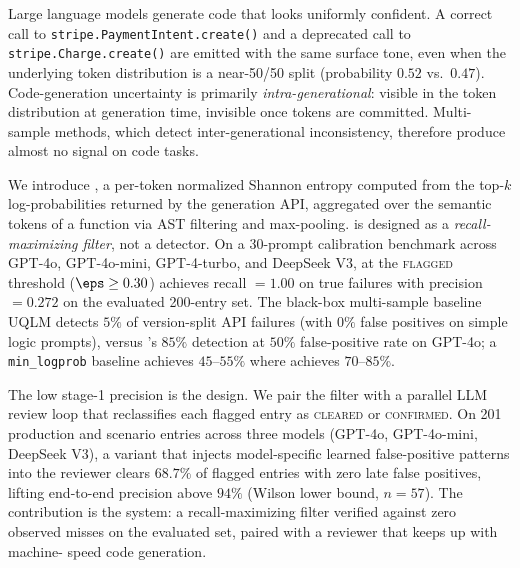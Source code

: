 Large language models generate code that looks uniformly confident. A correct
call to \texttt{stripe.PaymentIntent.create()} and a deprecated call to
\texttt{stripe.Charge.create()} are emitted with the same surface tone, even
when the underlying token distribution is a near-50/50 split (probability
$0.52$ vs.\ $0.47$). Code-generation uncertainty is primarily \emph{intra-generational}: visible
in the token distribution at generation time, invisible once tokens are
committed. Multi-sample methods, which detect inter-generational
inconsistency, therefore produce almost no signal on code tasks.

We introduce \eps, a per-token normalized Shannon entropy computed from the
top-$k$ log-probabilities returned by the generation API, aggregated over the
semantic tokens of a function via AST filtering and max-pooling. \eps is
designed as a \emph{recall-maximizing filter}, not a detector. On a
30-prompt calibration benchmark across GPT-4o, GPT-4o-mini, GPT-4-turbo, and DeepSeek V3,
\eps at the \textsc{flagged} threshold ($\eps \ge 0.30$) achieves recall
$=1.00$ on true failures with precision $=0.272$ on the evaluated 200-entry set. The black-box multi-sample
baseline UQLM detects $5\%$ of version-split API failures (with $0\%$ false positives on simple logic prompts), versus \eps's $85\%$ detection at $50\%$ false-positive rate on GPT-4o;
a \texttt{min\_logprob} baseline achieves $45$--$55\%$ where \eps achieves
$70$--$85\%$.

The low stage-1 precision is the design. We pair the filter with a parallel
LLM review loop that reclassifies each flagged entry as \textsc{cleared} or
\textsc{confirmed}. On 201 production and scenario entries across three
models (GPT-4o, GPT-4o-mini, DeepSeek V3), a variant that injects model-specific learned false-positive
patterns into the reviewer clears $68.7\%$ of flagged entries with zero
late false positives, lifting end-to-end precision above $94\%$ (Wilson
lower bound, $n=57$). The contribution is the system: a recall-maximizing filter
verified against zero observed misses on the evaluated set, paired with a reviewer that keeps up with machine-%
speed code generation.
